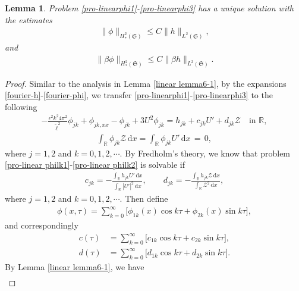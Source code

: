 \documentclass[10pt, reqno]{amsart}
\numberwithin{equation}{section}
\newtheorem{lemma}[theorem]{Lemma}
\theoremstyle{definition}
\begin{document}
{{\begin{lemma} \label{pro-linear lemma6-1}
Problem \eqref{pro-linearphi1}-\eqref{pro-linearphi3} has a unique solution with the estimates
\begin{align} \label{pro estimate H2-l2}
 \|\phi\|_{H^2_*(\mathfrak S)} \leq C \|h\|_{L^2(\mathfrak S)},
\end{align}
and
\begin{align} \label{pro estimate H2-l2-beta}
 \|\beta\phi\|_{H^2_*(\mathfrak S)} \leq C \|\beta h\|_{L^2(\mathfrak S)}.
\end{align}
\end{lemma}
\begin{proof}
Similar to the analysis in Lemma \ref{linear lemma6-1}, by the expansions \eqref{fourier-h}-\eqref{fourier-phi}, we transfer \eqref{pro-linearphi1}-\eqref{pro-linearphi3} to the following
\begin{align} \label{pro-linear philk1}
 - \frac{\epsilon^2k^2 4\pi^2}{{\tilde\ell}^2}\phi_{jk}+ \phi_{jk, xx} - \phi_{jk}+3U^2\phi_{jk} = h_{jk} +c_{jk}U'+ d_{jk}\mathcal{Z}
 \quad \mbox{in } {\mathbb R},
\end{align}
\begin{align} \label{pro-linear philk2}
 \int_{\mathbb R}\phi_{jk}{\mathcal Z} \,{\mathrm d}x= \int_{\mathbb R}\phi_{jk} U' \,{\mathrm d}x \,=\, 0,
\end{align}
where $j=1,2$ and $k=0,1,2,\cdots$.
By Fredholm's theory, we know that problem \eqref{pro-linear philk1}-\eqref{pro-linear philk2} is solvable if
\begin{align*}
c_{jk} = - \frac{\displaystyle\int_{\mathbb R} h_{jk} U' \,{\mathrm d}x} {\displaystyle\int_{\mathbb R} |U'|^2 \,{\mathrm d}x},
\qquad
d_{jk} = - \frac{\displaystyle\int_{\mathbb R} h_{jk} {\mathcal Z} \,{\mathrm d}x} {\displaystyle\int_{\mathbb R}{\mathcal Z}^2 \,{\mathrm d}x},
\end{align*}
where $j=1,2$ and $k=0,1,2,\cdots$.
Then define
\begin{align*}
\phi(x, \tau) = \sum_{k=0}^\infty \Big[\phi_{1k} (x)\cos k\tau + \phi_{2k} (x)\sin k\tau\Big],
\end{align*}
and correspondingly
\begin{align*}
c(\tau) & = \sum_{k=0}^\infty \Big[c_{1k}\cos k\tau + c_{2k}\sin k\tau\Big],
\\
d(\tau) & = \sum_{k=0}^\infty \Big[d_{1k}\cos k\tau + d_{2k}\sin k\tau\Big].
\end{align*}
 By Lemma \ref{linear lemma6-1}, we have
\begin{align} \label{es1}

\end{align}
\end{proof}}}
\end{document}
